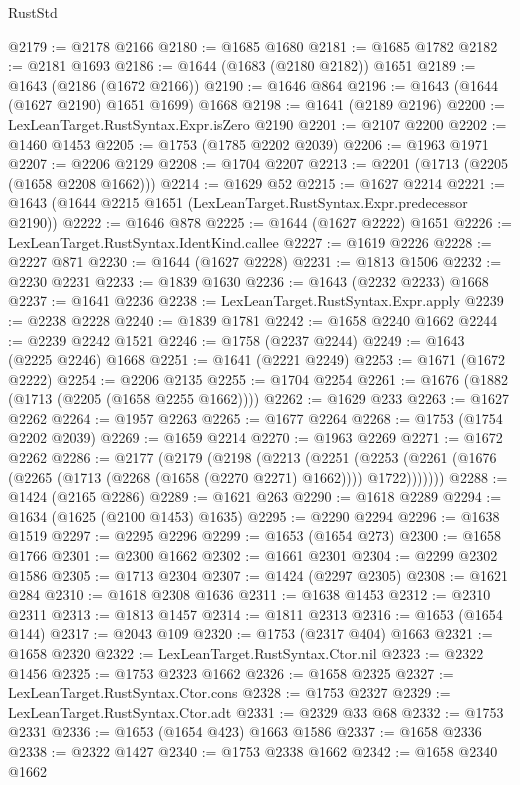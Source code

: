\begin{lexlean}{RustStd}
\begin{coremodule}
@2179 := @2178 @2166
@2180 := @1685 @1680
@2181 := @1685 @1782
@2182 := @2181 @1693
@2186 := @1644 (@1683 (@2180 @2182)) @1651
@2189 := @1643 (@2186 (@1672 @2166))
@2190 := @1646 @864
@2196 := @1643 (@1644 (@1627 @2190) @1651 @1699) @1668
@2198 := @1641 (@2189 @2196)
@2200 := LexLeanTarget.RustSyntax.Expr.isZero @2190
@2201 := @2107 @2200
@2202 := @1460 @1453
@2205 := @1753 (@1785 @2202 @2039)
@2206 := @1963 @1971
@2207 := @2206 @2129
@2208 := @1704 @2207
@2213 := @2201 (@1713 (@2205 (@1658 @2208 @1662)))
@2214 := @1629 @52
@2215 := @1627 @2214
@2221 := @1643 (@1644 @2215 @1651 (LexLeanTarget.RustSyntax.Expr.predecessor @2190))
@2222 := @1646 @878
@2225 := @1644 (@1627 @2222) @1651
@2226 := LexLeanTarget.RustSyntax.IdentKind.callee
@2227 := @1619 @2226
@2228 := @2227 @871
@2230 := @1644 (@1627 @2228)
@2231 := @1813 @1506
@2232 := @2230 @2231
@2233 := @1839 @1630
@2236 := @1643 (@2232 @2233) @1668
@2237 := @1641 @2236
@2238 := LexLeanTarget.RustSyntax.Expr.apply
@2239 := @2238 @2228
@2240 := @1839 @1781
@2242 := @1658 @2240 @1662
@2244 := @2239 @2242 @1521
@2246 := @1758 (@2237 @2244)
@2249 := @1643 (@2225 @2246) @1668
@2251 := @1641 (@2221 @2249)
@2253 := @1671 (@1672 @2222)
@2254 := @2206 @2135
@2255 := @1704 @2254
@2261 := @1676 (@1882 (@1713 (@2205 (@1658 @2255 @1662))))
@2262 := @1629 @233
@2263 := @1627 @2262
@2264 := @1957 @2263
@2265 := @1677 @2264
@2268 := @1753 (@1754 @2202 @2039)
@2269 := @1659 @2214
@2270 := @1963 @2269
@2271 := @1672 @2262
@2286 := @2177
    (@2179
      (@2198
        (@2213
          (@2251
            (@2253 (@2261 (@1676 (@2265 (@1713 (@2268 (@1658 (@2270 @2271) @1662)))) @1722)))))))
@2288 := @1424 (@2165 @2286)
@2289 := @1621 @263
@2290 := @1618 @2289
@2294 := @1634 (@1625 (@2100 @1453) @1635)
@2295 := @2290 @2294
@2296 := @1638 @1519
@2297 := @2295 @2296
@2299 := @1653 (@1654 @273)
@2300 := @1658 @1766
@2301 := @2300 @1662
@2302 := @1661 @2301
@2304 := @2299 @2302 @1586
@2305 := @1713 @2304
@2307 := @1424 (@2297 @2305)
@2308 := @1621 @284
@2310 := @1618 @2308 @1636
@2311 := @1638 @1453
@2312 := @2310 @2311
@2313 := @1813 @1457
@2314 := @1811 @2313
@2316 := @1653 (@1654 @144)
@2317 := @2043 @109
@2320 := @1753 (@2317 @404) @1663
@2321 := @1658 @2320
@2322 := LexLeanTarget.RustSyntax.Ctor.nil
@2323 := @2322 @1456
@2325 := @1753 @2323 @1662
@2326 := @1658 @2325
@2327 := LexLeanTarget.RustSyntax.Ctor.cons
@2328 := @1753 @2327
@2329 := LexLeanTarget.RustSyntax.Ctor.adt
@2331 := @2329 @33 @68
@2332 := @1753 @2331
@2336 := @1653 (@1654 @423) @1663 @1586
@2337 := @1658 @2336
@2338 := @2322 @1427
@2340 := @1753 @2338 @1662
@2342 := @1658 @2340 @1662

\end{coremodule}
\end{lexlean}
